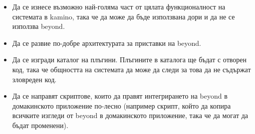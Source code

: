 \documentclass[pdftex,14pt,a4paper]{extreport}
\begin{document}
\begin{itemize}
  \item Да се изнесе възможно най-голяма част от цялата функционалност на системата в kamino, така че да може да бъде използвана дори и да не се използва beyond.
  \item Да се развие по-добре архитектурата за приставки на beyond.
  \item Да се изгради каталог на плъгини. Плъгините в каталога ще бъдат с отворен код, така че общността на системата да може да следи за това да не съдържат зловреден код.
  \item Да се направят скриптове, които да правят интегрирането на beyond в домакинското приложение по-лесно (например скрипт, който да копира всичките изгледи от beyond в домакинското приложение, така че да могат да бъдат променени).
\end{itemize}
\end{document}
